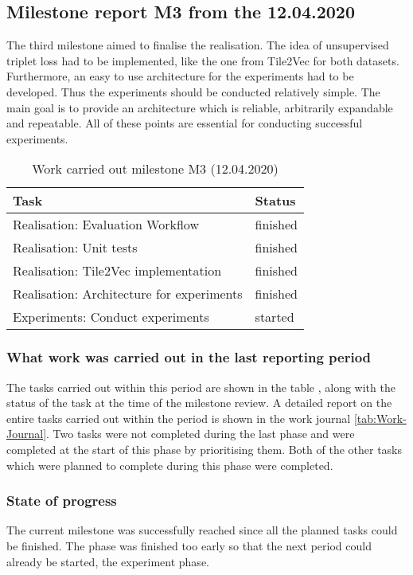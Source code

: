 \subsection{Milestone report M3 from the 12.04.2020}
The third milestone aimed to finalise the realisation. The idea of unsupervised triplet loss had to be implemented, like the one from Tile2Vec for both datasets. Furthermore, an easy to use architecture for the experiments had to be developed. Thus the experiments should be conducted relatively simple. The main goal is to provide an architecture which is reliable, arbitrarily expandable and repeatable. All of these points are essential for conducting successful experiments.

\begin{table}[htbp]
    \centering
    \caption{Work carried out milestone M3 (12.04.2020)}
	\label{tab:Work-Carried-Out-M3}
    \begin{tabular}{p{} | p{}}
        \toprule
        \textbf{Task} & \textbf{Status} \\ 
        \midrule[1pt]
        Realisation: Evaluation Workflow & finished \\
        \hline
        Realisation: Unit tests & finished \\
        \hline
        Realisation: Tile2Vec implementation & finished \\
        \hline
        Realisation: Architecture for experiments & finished \\
        \hline
        Experiments: Conduct experiments & started \\
        \bottomrule
    \end{tabular}
\end{table}

\subsubsection{What work was carried out in the last reporting period}
The tasks carried out within this period are shown in the table , along with the status of the task at the time of the milestone review. A detailed report on the entire tasks carried out within the period is shown in the work journal \ref{tab:Work-Journal}. Two tasks were not completed during the last phase and were completed at the start of this phase by prioritising them. Both of the other tasks which were planned to complete during this phase were completed.

\subsubsection{State of progress}
The current milestone was successfully reached since all the planned tasks could be finished. The phase was finished too early so that the next period could already be started, the experiment phase. 

